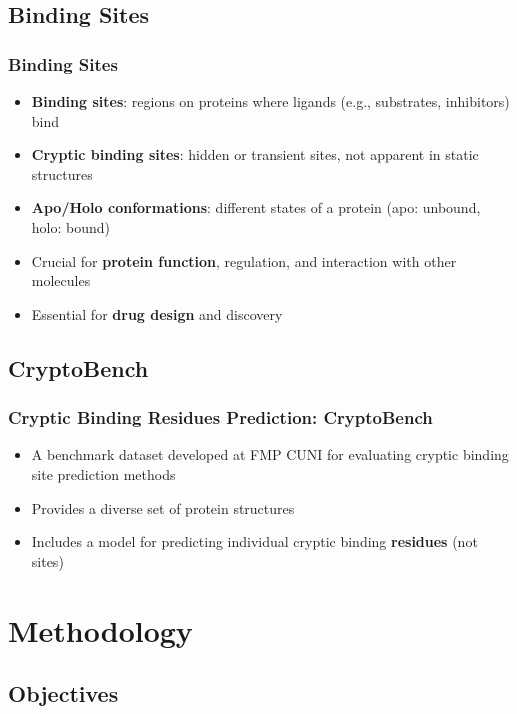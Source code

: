 \documentclass[aspectratio=169]{beamer}
\begin{document}
\subsection{Binding Sites}

\begin{frame}
  \frametitle{Binding Sites}

  \begin{itemize}
    \item \textbf{Binding sites}: regions on proteins where ligands (e.g., substrates, inhibitors) bind
    \item \textbf{Cryptic binding sites}: hidden or transient sites, not apparent in static structures
    \item \textbf{Apo/Holo conformations}: different states of a protein (apo: unbound, holo: bound)
  \end{itemize}

  \begin{itemize}
    \item Crucial for \textbf{protein function}, regulation, and interaction with other molecules
    \item Essential for \textbf{drug design} and discovery
  \end{itemize}

\end{frame}

\subsection{CryptoBench}

\begin{frame}
  \frametitle{Cryptic Binding Residues Prediction: CryptoBench}
  \begin{itemize}
    \item A benchmark dataset developed at FMP CUNI for evaluating cryptic binding site prediction methods
    \item Provides a diverse set of protein structures
    \item Includes a model for predicting individual cryptic binding \textbf{residues} (not sites)
  \end{itemize}

\end{frame}

\section{Methodology}
\subsection{Objectives}
\end{document}
